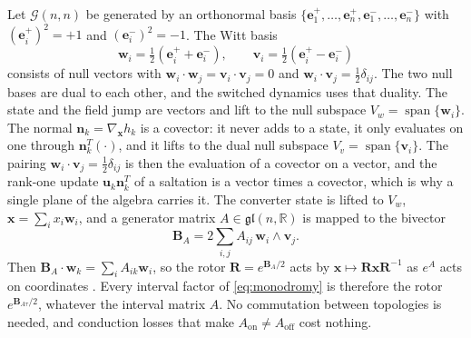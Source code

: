 \documentclass[journal]{IEEEtran}
\newcommand{\Gnn}{\mathcal{G}(n,n)}
\begin{document}
Let $\Gnn$ be generated by an orthonormal basis
$\{\bm{e}^{+}_1,\dots,\bm{e}^{+}_n,\bm{e}^{-}_1,\dots,\bm{e}^{-}_n\}$ with
$(\bm{e}^{+}_i)^2=+1$ and $(\bm{e}^{-}_i)^2=-1$. The Witt basis
\begin{equation}
\bm{w}_i=\tfrac12(\bm{e}^{+}_i+\bm{e}^{-}_i),\qquad
\bm{v}_i=\tfrac12(\bm{e}^{+}_i-\bm{e}^{-}_i)
\end{equation}
consists of null vectors with $\bm{w}_i\!\cdot\! \bm{w}_j=\bm{v}_i\!\cdot\! \bm{v}_j=0$
and $\bm{w}_i\!\cdot\! \bm{v}_j=\tfrac12\delta_{ij}$. The two null bases are
dual to each other, and the switched dynamics uses that duality. The state
and the field jump are vectors and lift to the null subspace
$V_w=\operatorname{span}\{\bm{w}_i\}$. The normal $\bm{n}_k=\nabla_{\bm{x}}h_k$
is a covector: it never adds to a state, it only evaluates on one through
$\bm{n}_k^{T}(\cdot)$, and it lifts to the dual null subspace
$V_v=\operatorname{span}\{\bm{v}_i\}$. The pairing
$\bm{w}_i\!\cdot\!\bm{v}_j=\tfrac12\delta_{ij}$ is then the evaluation of a
covector on a vector, and the rank-one update $\bm{u}_k\bm{n}_k^{T}$ of a
saltation is a vector times a covector, which is why a single plane of the
algebra carries it. The converter state is lifted to $V_w$,
$\bm{x}=\sum_i x_i\bm{w}_i$, and a generator matrix
$A\in\mathfrak{gl}(n,\mathbb{R})$ is mapped to the bivector
\begin{equation}
\bm{B}_A=2\sum_{i,j}A_{ij}\,\bm{w}_i\wedge \bm{v}_j .
\label{eq:dict}
\end{equation}
Then $\bm{B}_A\!\cdot\! \bm{w}_k=\sum_i A_{ik}\bm{w}_i$, so the rotor
$\bm{R}=e^{\bm{B}_A/2}$ acts by $\bm{x}\mapsto\bm{R}\bm{x}\bm{R}^{-1}$ as
$e^{A}$ acts on coordinates \cite{doran1993lie}. Every interval factor of
\eqref{eq:monodromy} is therefore the rotor $e^{\bm{B}_{A\tau}/2}$, whatever
the interval matrix $A$. No commutation between topologies is needed, and
conduction losses that make $A_{\mathrm{on}}\neq A_{\mathrm{off}}$ cost
nothing.
\end{document}
